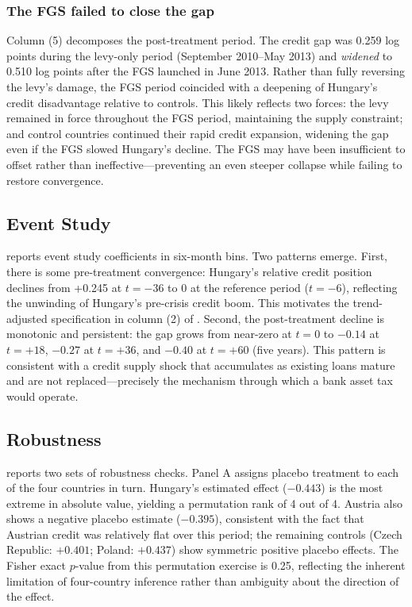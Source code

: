 \documentclass[12pt]{article}
\begin{document}


\subsubsection*{The FGS failed to close the gap} Column (5) decomposes the post-treatment period. The credit gap was 0.259 log points during the levy-only period (September 2010--May 2013) and \textit{widened} to 0.510 log points after the FGS launched in June 2013. Rather than fully reversing the levy's damage, the FGS period coincided with a deepening of Hungary's credit disadvantage relative to controls. This likely reflects two forces: the levy remained in force throughout the FGS period, maintaining the supply constraint; and control countries continued their rapid credit expansion, widening the gap even if the FGS slowed Hungary's decline. The FGS may have been insufficient to offset rather than ineffective---preventing an even steeper collapse while failing to restore convergence.

\subsection{Event Study}

 reports event study coefficients in six-month bins. Two patterns emerge. First, there is some pre-treatment convergence: Hungary's relative credit position declines from +0.245 at $t = -36$ to 0 at the reference period ($t = -6$), reflecting the unwinding of Hungary's pre-crisis credit boom. This motivates the trend-adjusted specification in column (2) of . Second, the post-treatment decline is monotonic and persistent: the gap grows from near-zero at $t = 0$ to $-0.14$ at $t = +18$, $-0.27$ at $t = +36$, and $-0.40$ at $t = +60$ (five years). This pattern is consistent with a credit supply shock that accumulates as existing loans mature and are not replaced---precisely the mechanism through which a bank asset tax would operate.



\subsection{Robustness}

 reports two sets of robustness checks. Panel A assigns placebo treatment to each of the four countries in turn. Hungary's estimated effect ($-0.443$) is the most extreme in absolute value, yielding a permutation rank of 4 out of 4. Austria also shows a negative placebo estimate ($-0.395$), consistent with the fact that Austrian credit was relatively flat over this period; the remaining controls (Czech Republic: $+0.401$; Poland: $+0.437$) show symmetric positive placebo effects. The Fisher exact $p$-value from this permutation exercise is 0.25, reflecting the inherent limitation of four-country inference rather than ambiguity about the direction of the effect.
\end{document}
